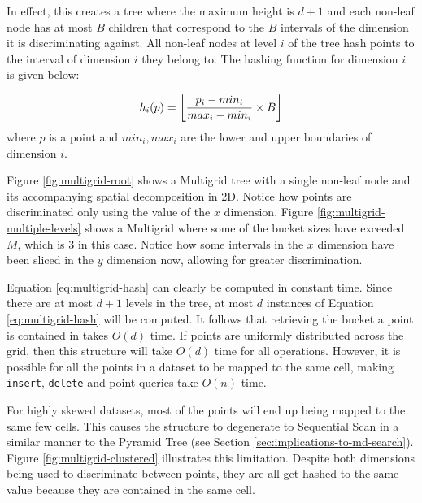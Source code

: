 In effect, this creates a tree where the maximum height is $d + 1$ and each non-leaf node has at most $B$ children that correspond to the $B$ intervals of the dimension it is discriminating against. All non-leaf nodes at level $i$ of the tree hash points to the interval of dimension $i$ they belong to. The hashing function for dimension $i$ is given below:

\begin{equation}
	h_i(p) = \floor*{\frac{p_i - min_i}{max_i - min_i} \times B}
	\label{eq:multigrid-hash}
\end{equation}
where $p$ is a point and $min_i, max_i$ are the lower and upper boundaries of dimension $i$.

Figure \ref{fig:multigrid-root} shows a Multigrid tree with a single non-leaf node and its accompanying spatial decomposition in 2D. Notice how points are discriminated only using the value of the $x$ dimension. Figure \ref{fig:multigrid-multiple-levels} shows a Multigrid where some of the bucket sizes have exceeded $M$, which is 3 in this case. Notice how some intervals in the $x$ dimension have been sliced in the $y$ dimension now, allowing for greater discrimination.

Equation \ref{eq:multigrid-hash} can clearly be computed in constant time. Since there are at most $d + 1$ levels in the tree, at most $d$ instances of Equation \ref{eq:multigrid-hash} will be computed. It follows that retrieving the bucket a point is contained in takes $O(d)$ time. If points are uniformly distributed across the grid, then this structure will take $O(d)$ time for all operations.  However, it is possible for all the points in a dataset to be mapped to the same cell, making \texttt{insert}, \texttt{delete} and point queries take $O(n)$ time.

For highly skewed datasets, most of the points will end up being mapped to the same few cells. This causes the structure to degenerate to Sequential Scan in a similar manner to the Pyramid Tree (see Section \ref{sec:implications-to-md-search}). Figure \ref{fig:multigrid-clustered} illustrates this limitation. Despite both dimensions being used to discriminate between points, they are all get hashed to the same value because they are contained in the same cell.

